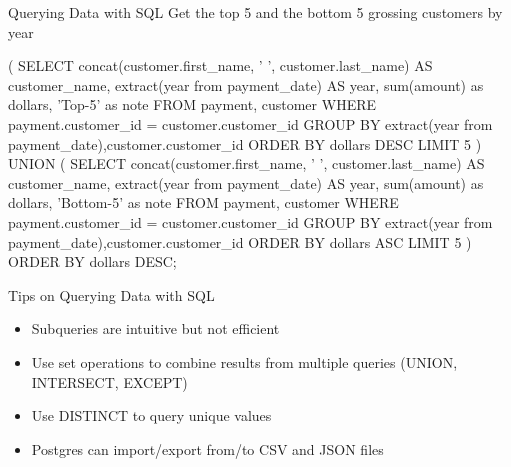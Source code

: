 \documentclass[ignorenonframetext,xcolor=x11names]{beamer}
\begin{document}
\begin{frame}[label=withcode,fragile]{Querying Data with SQL}
Get the top 5 and the bottom 5 grossing customers by year
\scriptsize
\begin{sqlcode}
( SELECT concat(customer.first_name, ' ', 
             customer.last_name) AS customer_name,
       extract(year from payment_date) AS year, 
       sum(amount) as dollars,
       'Top-5' as note
FROM payment, customer
WHERE payment.customer_id = customer.customer_id
GROUP BY extract(year from payment_date),customer.customer_id
ORDER BY dollars DESC LIMIT 5
) UNION (
SELECT concat(customer.first_name, ' ', 
           customer.last_name) AS customer_name,
       extract(year from payment_date) AS year, 
       sum(amount) as dollars,
       'Bottom-5' as note
FROM payment, customer
WHERE payment.customer_id = customer.customer_id
GROUP BY extract(year from payment_date),customer.customer_id
ORDER BY dollars ASC LIMIT 5 ) 
ORDER BY dollars DESC;
\end{sqlcode}
\end{frame}

\begin{frame}[label=withcode]{Tips on Querying Data with SQL}
\begin{itemize}
  \item Subqueries are intuitive but not efficient
  \item Use set operations to combine results from multiple queries (UNION, INTERSECT, EXCEPT)
  \item Use DISTINCT to query unique values
  \item Postgres can import/export from/to CSV and JSON files
\end{itemize}
\end{frame}
\end{document}
